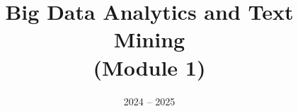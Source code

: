 \documentclass[11pt]{ainotes}
\title{Big Data Analytics and Text Mining\\(Module 1)}
\date{2024 -- 2025}
\begin{document}
    \makenotesfront
    
\end{document}
